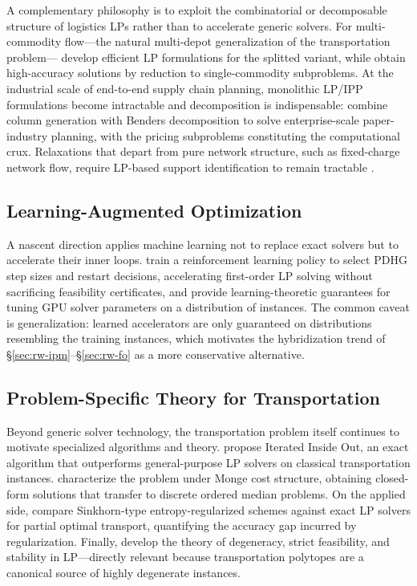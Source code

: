A complementary philosophy is to exploit the combinatorial or decomposable structure of logistics LPs rather than to accelerate generic solvers. For multi-commodity flow---the natural multi-depot generalization of the transportation problem---\citet{dai2019mcf} develop efficient LP formulations for the splitted variant, while \citet{brand2023mcf} obtain high-accuracy solutions by reduction to single-commodity subproblems. At the industrial scale of end-to-end supply chain planning, monolithic LP/IPP formulations become intractable and decomposition is indispensable: \citet{guan2026supplychain} combine column generation with Benders decomposition to solve enterprise-scale paper-industry planning, with the pricing subproblems constituting the computational crux. Relaxations that depart from pure network structure, such as fixed-charge network flow, require LP-based support identification to remain tractable \citep{saraswathi2026support}.

\subsection{Learning-Augmented Optimization}
\label{sec:rw-learning}

A nascent direction applies machine learning not to replace exact solvers but to accelerate their inner loops. \citet{sul2026rl} train a reinforcement learning policy to select PDHG step sizes and restart decisions, accelerating first-order LP solving without sacrificing feasibility certificates, and \citet{prasad2026tuning} provide learning-theoretic guarantees for tuning GPU solver parameters on a distribution of instances. The common caveat is generalization: learned accelerators are only guaranteed on distributions resembling the training instances, which motivates the hybridization trend of \S\ref{sec:rw-ipm}--\S\ref{sec:rw-fo} as a more conservative alternative.

\subsection{Problem-Specific Theory for Transportation}
\label{sec:rw-tp}

Beyond generic solver technology, the transportation problem itself continues to motivate specialized algorithms and theory. \citet{bargetto2023iterated} propose Iterated Inside Out, an exact algorithm that outperforms general-purpose LP solvers on classical transportation instances. \citet{nickel2026monge} characterize the problem under Monge cost structure, obtaining closed-form solutions that transfer to discrete ordered median problems. On the applied side, \citet{bai2024sinkhorn} compare Sinkhorn-type entropy-regularized schemes against exact LP solvers for partial optimal transport, quantifying the accuracy gap incurred by regularization. Finally, \citet{im2022degeneracy} develop the theory of degeneracy, strict feasibility, and stability in LP---directly relevant because transportation polytopes are a canonical source of highly degenerate instances.

